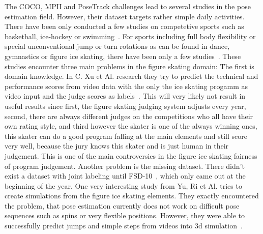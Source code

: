 \begin{flushleft}
    The COCO, MPII and PoseTrack challenges lead to several studies in the pose estimation field.
    However, their dataset targets rather simple daily activities.
    There have been only conducted a few studies on competetive sports such as basketball, ice-hockey or
    swimming~\cite{synergetic, posehockey, swimm}.
    For sports including full body flexibility or special unconventional jump or turn rotations as can be found
    in dance, gymnastics or figure ice skating,
    there have been only a few studies~\cite{dance, figureskatingsimulation, scorefigureskating, fsd10}.
    These studies encounter three main problems in the figure skating domain:
    The first is domain knowledge.
    In C. {Xu} et Al. research they try to predict the technical and performance scores from video data with the
    only the
    ice skating progamm as video input and the judge scores as labels~\cite{scorefigureskating}.
    This will very likely not result in useful results since first, the figure skating judging system adjusts
    every year,
    second, there are always different judges on the competitions who all have their own rating style, and third
    however the skater is one of the always winning
    ones, this skater can do a good program falling at the main elements and still score very well, because the
    jury knows this skater and is just human in
    their judgement.
    This is one of the main controversies in the figure ice skating fairness of program judgement.
    Another problem is the missing dataset.
    There didn't exist a dataset with joint labeling until FSD-10~\cite{fsd10}, which only came out at the
    beginning of the year.
    One very interesting study from Yu, Ri et Al. tries to create simulations from the figure ice skating elements.
    They exactly encountered the problem, that pose estimation currently does not work on difficult pose sequences
    such as spins or very flexible positions.
    However, they were able to successfully predict jumps and simple steps from videos into 3d
    simulation~\cite{simplebaselines}.
\end{flushleft}
